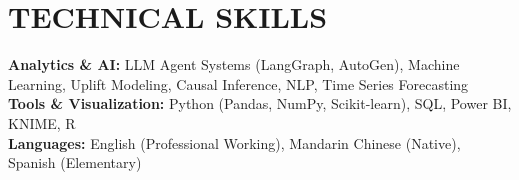 \documentclass[letterpaper,11pt]{article}
\begin{document}
\section{TECHNICAL SKILLS}

{\small\noindent
\textbf{Analytics \& AI:} LLM Agent Systems (LangGraph, AutoGen), Machine Learning, Uplift Modeling, Causal Inference, NLP, Time Series Forecasting\\[1pt]
\textbf{Tools \& Visualization:} Python (Pandas, NumPy, Scikit-learn), SQL, Power BI, KNIME, R\\[1pt]
\textbf{Languages:} English (Professional Working), Mandarin Chinese (Native), Spanish (Elementary)%
}
\end{document}
